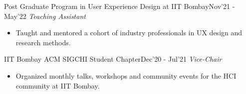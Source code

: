 
\begin{projects}

\projecta
	{Post Graduate Program in User Experience Design at IIT Bombay}{Nov'21 - May'22}
	{
	    \textit{Teaching Assistant}
	}
	{\begin{itemize}
     \item Taught and mentored a cohort of industry professionals in UX design and research methods.
     \end{itemize}}

\projecta
	{IIT Bombay ACM SIGCHI Student Chapter}{Dec'20 - Jul'21}
	{
	    \textit{Vice-Chair}
	}
	{\begin{itemize}
     \item Organized monthly talks, workshops and community events for the HCI community at IIT Bombay.
     \end{itemize}}
\end{projects}
\vspace{-3mm}
